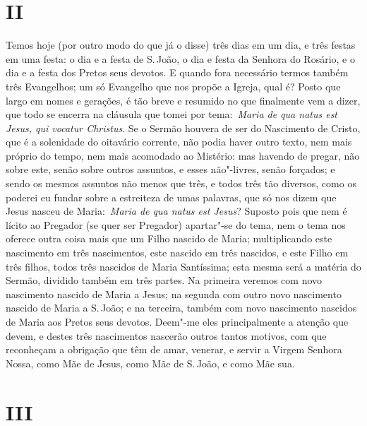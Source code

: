 \section{II}

Temos hoje (por outro modo do que já o disse) três dias em
um dia, e três festas em uma festa: o dia e a festa de S.\,João, o dia e
festa da Senhora do Rosário, e o dia e a festa dos Pretos seus devotos.
E quando fora necessário termos também três Evangelhos; um só Evangelho
que nos propõe a Igreja, qual é? Posto que largo em nomes e gerações, é
tão breve e resumido no que finalmente vem a dizer, que todo se encerra
na cláusula que tomei por tema:~\emph{Maria de qua natus est Jesus, qui
vocatur Christus}. Se o Sermão houvera de ser do Nascimento de Cristo,
que é a solenidade do oitavário corrente, não podia haver outro texto,
nem mais próprio do tempo, nem mais acomodado ao Mistério: mas havendo
de pregar, não sobre este, senão sobre outros assuntos, e esses
não"-livres, senão forçados; e sendo os mesmos assuntos não menos que
três, e todos três tão diversos, como os poderei eu fundar sobre a
estreiteza de umas palavras, que só nos dizem que Jesus nasceu de
Maria:~\emph{Maria de qua natus est Jesus}? Suposto pois que nem é
lícito ao Pregador (se quer ser Pregador) apartar"-se do tema, nem o tema
nos oferece outra coisa mais que um Filho nascido de Maria;
multiplicando este nascimento em três nascimentos, este nascido em três
nascidos, e este Filho em três filhos, todos três nascidos de Maria
Santíssima; esta mesma será a matéria do Sermão, dividido também em três
partes. Na primeira veremos com novo nascimento nascido de Maria a
Jesus; na segunda com outro novo nascimento nascido de Maria a S.\,João;
e na terceira, também com novo nascimento nascidos de Maria aos Pretos
seus devotos. Deem"-me eles principalmente a atenção que devem, e destes
três nascimentos nascerão outros tantos motivos, com que reconheçam a
obrigação que têm de amar, venerar, e servir a Virgem Senhora Nossa,
como Mãe de Jesus, como Mãe de S.\,João, e como Mãe sua.

\section{III}

